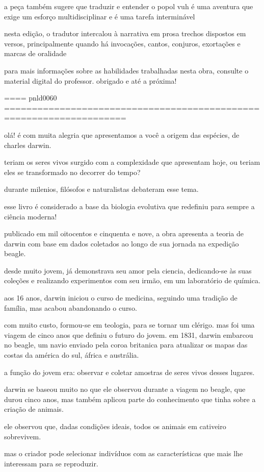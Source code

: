 a peça também sugere que traduzir e entender o popol vuh é uma aventura que exige um esforço multidisciplinar e é uma tarefa interminável

nesta edição, o tradutor intercalou à narrativa em prosa trechos dispostos em versos, principalmente quando há invocações, cantos, conjuros, exortações e marcas de oralidade


para mais informações sobre as habilidades trabalhadas nesta obra, consulte o material digital do professor. obrigado e até a próxima!


==== pnld0060 ====================================================================

olá! é com muita alegria que apresentamos a você a origem das espécies, de charles darwin.

teriam os seres vivos surgido com a complexidade que apresentam hoje, ou teriam eles se transformado no decorrer do tempo?

durante milenios, filósofos e naturalistas debateram esse tema.


esse livro é considerado a base da biologia evolutiva que redefiniu para sempre a ciência moderna!

publicado em mil oitocentos e cinquenta e nove, a obra apresenta a teoria de darwin com base em dados coletados ao longo de sua jornada na expedição beagle.

desde muito jovem, já demonstrava seu amor pela ciencia,
dedicando-se às suas coleções e realizando experimentos  com seu irmão,  em um laboratório de química.

aos 16 anos, darwin iniciou o curso de medicina,  seguindo uma tradição de família, mas acabou abandonando o curso.

com muito custo, formou-se em teologia, para se tornar um clérigo.
mas foi uma viagem de cinco anos que definiu o futuro do jovem.
em 1831, darwin embarcou no beagle, um navio enviado pela coroa britanica para atualizar os mapas das costas da américa do sul,  áfrica e austrália.

a função do jovem era: observar e coletar amostras de seres vivos desses lugares.

darwin se baseou  muito no que ele observou durante a viagem no beagle, que durou cinco anos, 
mas também aplicou parte do conhecimento que tinha sobre a criação de animais.

ele observou que, dadas condições ideais, todos os animais em cativeiro sobrevivem.

mas o criador pode selecionar indivíduos com as características que mais lhe interessam para se reproduzir.

